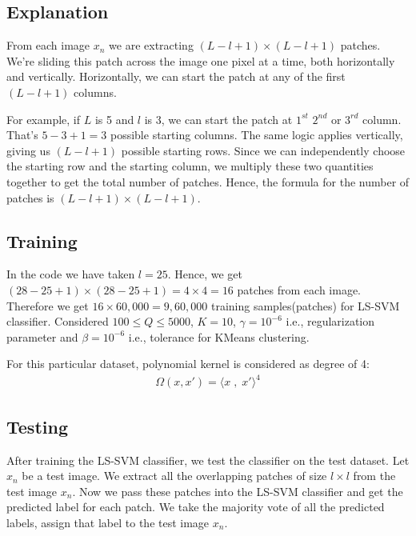 \documentclass[conference]{IEEEtran}
\begin{document}
    \subsection{Explanation}
    From each image $x_{n}$ we are extracting $(L - l +1) \times (L - l + 1)$ patches.
    We're sliding this patch across the image one pixel at a time, both horizontally and vertically.
    Horizontally, we can start the patch at any of the first $(L - l + 1)$ columns.

    For example, if $L$ is 5 and $l$ is $3$, we can start the patch at $1^{st}$ $2^{nd}$ or $3^{rd}$ column.
    That's $5 - 3 + 1 = 3$ possible starting columns.
    The same logic applies vertically, giving us $(L - l + 1)$ possible starting rows.
    Since we can independently choose the starting row and the starting column, we multiply these two quantities together to get the total number of patches.
    Hence, the formula for the number of patches is $(L - l + 1) \times (L - l + 1)$.

    \subsection{Training}
    In the code we have taken $l=25$.
    Hence, we get $(28-25+1) \times (28-25+1) = 4 \times 4 = 16$ patches from each image.
    Therefore we get  $16 \times 60,000 = 9,60,000$ training samples(patches) for LS-SVM classifier.
    Considered $100 \leq Q \leq 5000$, $K=10$, $\gamma = 10^{-6}$ i.e., regularization parameter and $\beta = 10^{-6}$ i.e., tolerance for KMeans clustering.

    For this particular dataset, polynomial kernel is considered as degree of 4:
    \begin{align*}
        \Omega(x, x\prime) = \langle x \;,\; x\prime  \rangle^{4}
    \end{align*}

    \subsection{Testing}
    After training the LS-SVM classifier, we test the classifier on the test dataset.
    Let $x_{n}$ be a test image.
    We extract all the overlapping patches of size $l \times l$ from the test image $x_{n}$.
    Now we pass these patches into the LS-SVM classifier and get the predicted label for each patch.
    We take the majority vote of all the predicted labels, assign that label to the test image $x_{n}$.
\end{document}
